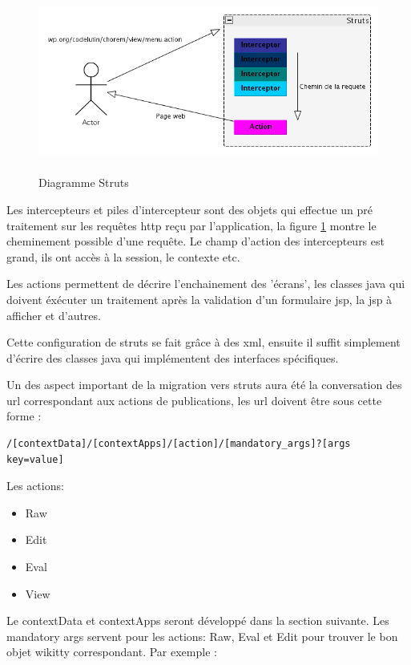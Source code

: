 \begin{figure}[!ht]
\centering
\includegraphics[height=6cm,width=17cm]{image/strutsexplain.png}
  		\caption{Diagramme Struts}
  		\label{diagstruts}
\end{figure}

Les intercepteurs et piles d'intercepteur sont des objets qui effectue un pré
traitement sur les requêtes http reçu par l'application, la figure \ref{diagstruts}
montre le cheminement possible d'une requête. Le champ d'action des intercepteurs
est grand, ils ont accès à la session, le contexte etc.

Les actions permettent de décrire l'enchainement des 'écrans', les classes java
qui doivent éxécuter un traitement après la validation d'un formulaire jsp, la
jsp à afficher et d'autres.

Cette configuration de struts se fait grâce à des xml, ensuite il suffit
simplement d'écrire des classes java qui implémentent des interfaces
spécifiques.

Un des aspect important de la migration vers struts aura été la conversation des
url correspondant aux actions de publications, les url doivent être sous cette
forme : 
\begin{verbatim}
/[contextData]/[contextApps]/[action]/[mandatory_args]?[args key=value]
\end{verbatim}

Les actions: 
\begin{itemize}
\item Raw
\item Edit
\item Eval
\item View
\end{itemize}

Le contextData et contextApps seront développé dans la section suivante. Les
mandatory args servent pour les actions: Raw, Eval et Edit pour trouver le bon 
objet wikitty correspondant. Par exemple :

